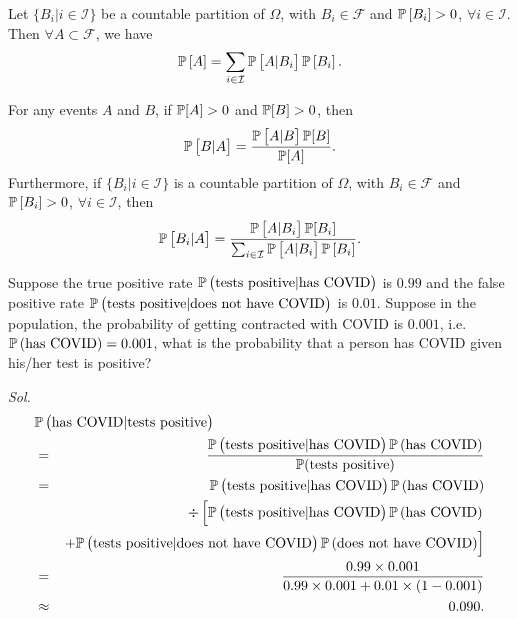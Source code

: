 \begin{theorem}
    Let $\{ B_i | i \in \mathcal{I} \}$ be a countable partition of $\Omega$, with $B_i \in \mathcal{F}$ and $\mathbb{P} \left[ B_i \right] > 0$, $\forall i \in \mathcal{I}$. Then $\forall A \subset \mathcal{F}$, we have 
    \begin{equation*}
        \mathbb{P} \left[ A \right] = \sum_{i \in \mathcal{I}} \mathbb{P} \left[ A | B_i \right] \mathbb{P} \left[ B_i \right].
    \end{equation*}
\end{theorem}

\begin{theorem}
    For any events $A$ and $B$, if $\mathbb{P} [A] > 0$ and $\mathbb{P} [B] > 0$, then 
    \begin{equation*}
        \mathbb{P} \left[ B | A \right] = \frac{\mathbb{P} \left[ A | B \right] \mathbb{P} [B]}{\mathbb{P} [A]}.
    \end{equation*}
    Furthermore, if $\{B_i | i \in \mathcal{I} \}$ is a countable partition of $\Omega$, with $B_i \in \mathcal{F}$ and $\mathbb{P} \left[ B_i \right] > 0$, $\forall i \in \mathcal{I}$, then 
    \begin{equation*}
        \mathbb{P} \left[ B_i | A \right] = \frac{\mathbb{P} \left[ A | B_i \right] \mathbb{P}[B_i]}{ \sum_{i\in\mathcal{I}} \mathbb{P} \left[ A | B_i \right] \mathbb{P} \left[ B_i \right]}.
    \end{equation*}
\end{theorem}

\begin{example}
    Suppose the \textcolor{myblue}{true positive rate} $\mathbb{P} \left( \text{tests positive} | \text{has COVID}\right)$ is $0.99$ and the \textcolor{myblue}{false positive rate} $\mathbb{P} \left( \text{tests positive} | \text{does not have COVID} \right)$ is $0.01$. Suppose in the population, the probability of getting contracted with COVID is $0.001$, i.e. $\mathbb{P} \left( \text{has COVID} \right) = 0.001$, what is the probability that a person has COVID given his/her test is positive?

    \textit{ Sol. }
    \begin{eqnarray*}
        \lefteqn{\prob \left(\text{has COVID} | \text{tests positive} \right)} \\ 
        & = & \frac{ \prob \left( \text{tests positive} | \text{has COVID} \right) \prob \left( \text{has COVID} \right)}{\prob (\text{tests positive})} \\ 
        & = & \prob \left( \text{tests positive} | \text{has COVID} \right) \prob \left( \text{has COVID} \right) \\ 
        & & \div \left[ \prob \left(\text{tests positive} | \text{has COVID} \right) \prob \left(\text{has COVID}\right) \right. \\
        & & \left. + \prob \left(\text{tests positive} | \text{does not have COVID} \right) \prob \left(\text{does not have COVID}\right) \right] \\ 
        & = & \frac{0.99 \times 0.001}{0.99 \times 0.001 + 0.01 \times (1-0.001)} \\ 
        & \approx & 0.090.
    \end{eqnarray*}
\end{example}